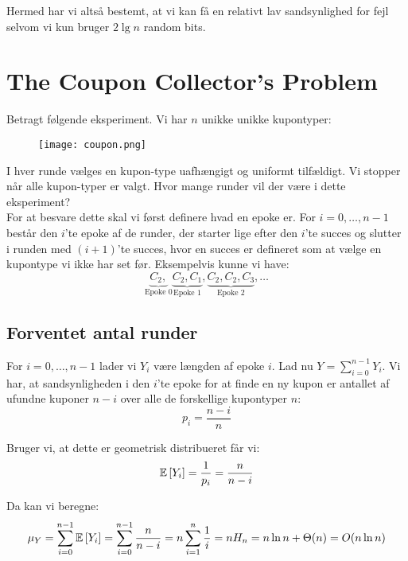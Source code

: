 Hermed har vi altså bestemt, at vi kan få en relativt lav sandsynlighed for fejl selvom vi kun bruger $2 \lg n$ random bits.







\newpage
\section{The Coupon Collector's Problem}
Betragt følgende eksperiment. Vi har $n$ unikke unikke kupontyper:
\begin{figure}[H]
  \begin{center}
  \texttt{[image: coupon.png]}
  \end{center}
  \label{fig:coupon}
\end{figure}

I hver runde vælges en kupon-type uafhængigt og uniformt tilfældigt. Vi stopper når alle kupon-typer er valgt. Hvor mange runder vil der være i dette eksperiment?\\

For at besvare dette skal vi først definere hvad en epoke er. For $i = 0, \dots, n-1$ består den $i$'te epoke af de runder, der starter lige efter den $i$'te succes og slutter i runden med $(i+1)$'te succes, hvor en succes er defineret som at vælge en kupontype vi ikke har set før. Eksempelvis kunne vi have:
$$
  \underbrace{C_2,}_{\text{Epoke 0}} \underbrace{C_2, C_1}_{\text{Epoke 1}}, \underbrace{C_2, C_2, C_3}_{\text{Epoke 2}}, \dots
$$


\subsection{Forventet antal runder}
For $i = 0, \dots, n-1$ lader vi $Y_i$ være længden af epoke $i$. Lad nu $Y = \sum_{i=0}^{n-1} Y_{i}$. Vi har, at sandsynligheden i den $i$'te epoke for at finde en ny kupon er antallet af ufundne kuponer $n-i$ over alle de forskellige kupontyper $n$:
$$
  p_i = \frac{n-i}{n}
$$

Bruger vi, at dette er geometrisk distribueret får vi:
$$
  \mathbb{E} \left[  Y_i  \right] = \frac{1}{p_i} = \frac{n}{n-i}
$$

Da kan vi beregne:
\begin{align*}
  \mu_Y
  = \sum_{i=0}^{n-1} \mathbb{E} \left[  Y_i  \right]
  = \sum_{i=0}^{n-1} \frac{n}{n-i}
  = n \sum_{i=1}^n \frac{1}{i}
  = n H_n
  = n \ln n + \Theta(n)
  = O(n \ln n)
\end{align*}


